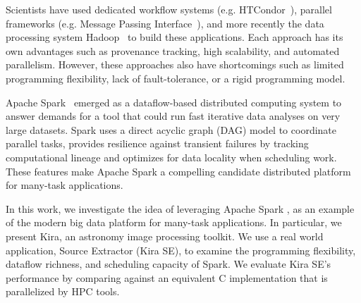 \documentclass[conference]{IEEEtran}
\begin{document}
Scientists have used dedicated workflow systems (e.g. HTCondor~\cite{litzkow88}), parallel frameworks (e.g. Message Passing Interface~\cite{gropp96}), and more recently the data processing system Hadoop~\cite{HADOOP}  to build these applications. Each approach has its own advantages such as provenance tracking, high scalability, and automated parallelism. However, these approaches also have shortcomings such as limited programming flexibility, lack of fault-tolerance, or a rigid programming model.


Apache Spark~\cite{zaharia12} emerged as a dataflow-based distributed computing system
to answer demands for a tool that could run fast iterative data analyses on very large datasets.
Spark uses a direct acyclic graph (DAG) model to coordinate parallel tasks, 
provides resilience against transient failures by tracking computational lineage
and optimizes for data locality when scheduling work.
These features make Apache Spark a compelling candidate distributed platform for many-task applications.

In this work, we investigate the idea of leveraging Apache Spark , as an example of the modern big data platform for many-task applications.
In particular, we present Kira, an astronomy image processing toolkit.
We use a real world application, Source Extractor (Kira SE), to examine the programming flexibility, dataflow richness,
and scheduling capacity of Spark. 
We evaluate Kira SE's performance by comparing against
an equivalent C implementation that is parallelized by HPC tools.
\end{document}
